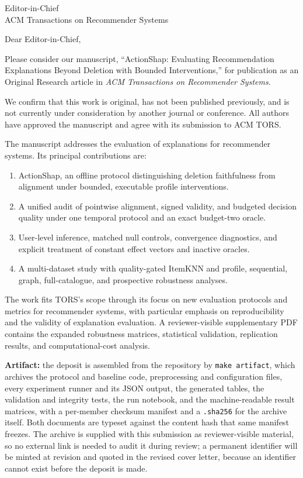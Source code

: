 \documentclass[10pt]{letter}
\date{August 22, 2026}
\begin{document}
\begin{letter}{%
Editor-in-Chief\\
ACM Transactions on Recommender Systems}

\opening{Dear Editor-in-Chief,}

Please consider our manuscript, ``ActionShap: Evaluating Recommendation Explanations Beyond Deletion with Bounded Interventions,'' for publication as an Original Research article in \emph{ACM Transactions on Recommender Systems}.

We confirm that this work is original, has not been published previously, and is not currently under consideration by another journal or conference. All authors have approved the manuscript and agree with its submission to ACM TORS.

The manuscript addresses the evaluation of explanations for recommender systems. Its principal contributions are:

\begin{enumerate}
  \item ActionShap, an offline protocol distinguishing deletion faithfulness from alignment under bounded, executable profile interventions.
  \item A unified audit of pointwise alignment, signed validity, and budgeted decision quality under one temporal protocol and an exact budget-two oracle.
  \item User-level inference, matched null controls, convergence diagnostics, and explicit treatment of constant effect vectors and inactive oracles.
  \item A multi-dataset study with quality-gated ItemKNN and profile, sequential, graph, full-catalogue, and prospective robustness analyses.
\end{enumerate}

The work fits TORS's scope through its focus on new evaluation protocols and metrics for recommender systems, with particular emphasis on reproducibility and the validity of explanation evaluation. A reviewer-visible supplementary PDF contains the expanded robustness matrices, statistical validation, replication results, and computational-cost analysis.

\textbf{Artifact:} the deposit is assembled from the repository by \texttt{make artifact}, which archives the protocol and baseline code, preprocessing and configuration files, every experiment runner and its JSON output, the generated tables, the validation and integrity tests, the run notebook, and the machine-readable result matrices, with a per-member checksum manifest and a \texttt{.sha256} for the archive itself. Both documents are typeset against the content hash that same manifest freezes. The archive is supplied with this submission as reviewer-visible material, so no external link is needed to audit it during review; a permanent identifier will be minted at revision and quoted in the revised cover letter, because an identifier cannot exist before the deposit is made.


\end{letter}
\end{document}
